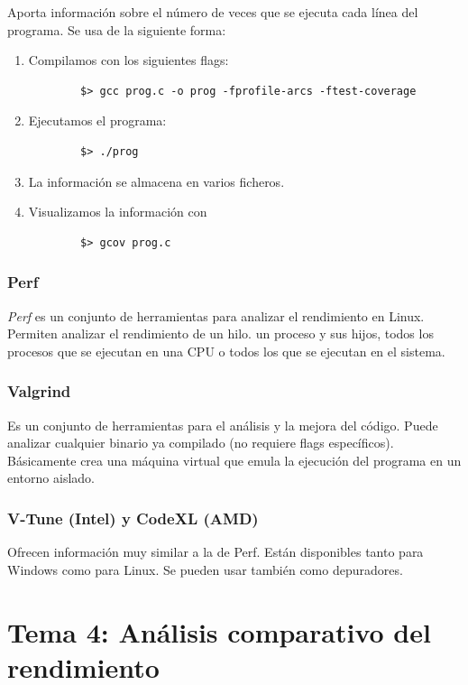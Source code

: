 \documentclass[12pt,spanish]{article}
\begin{document}
Aporta información sobre el número de veces que se ejecuta cada línea del programa. Se usa de la siguiente forma:

\begin{enumerate}
	\item Compilamos con los siguientes flags:
	\begin{lstlisting}
		$> gcc prog.c -o prog -fprofile-arcs -ftest-coverage
	\end{lstlisting}
	\item Ejecutamos el programa:
	\begin{lstlisting}
		$> ./prog
	\end{lstlisting}
	\item La información se almacena en varios ficheros.
	\item Visualizamos la información con
	\begin{lstlisting}
		$> gcov prog.c
	\end{lstlisting}
\end{enumerate}

\subsubsection{Perf}

\textit{Perf} es un conjunto de herramientas para analizar el rendimiento en Linux. Permiten analizar el rendimiento de un hilo. un proceso y sus hijos, todos los procesos que se ejecutan en una CPU o todos los que se ejecutan en el sistema.

\subsubsection{Valgrind}

Es un conjunto de herramientas para el análisis y la mejora del código. Puede analizar cualquier binario ya compilado (no requiere flags específicos). Básicamente crea una máquina virtual que emula la ejecución del programa en un entorno aislado.

\subsubsection{V-Tune (Intel) y CodeXL (AMD)}

Ofrecen información muy similar a la de Perf. Están disponibles tanto para Windows como para Linux. Se pueden usar también como depuradores.

\section{Tema 4: Análisis comparativo del rendimiento}
\end{document}
